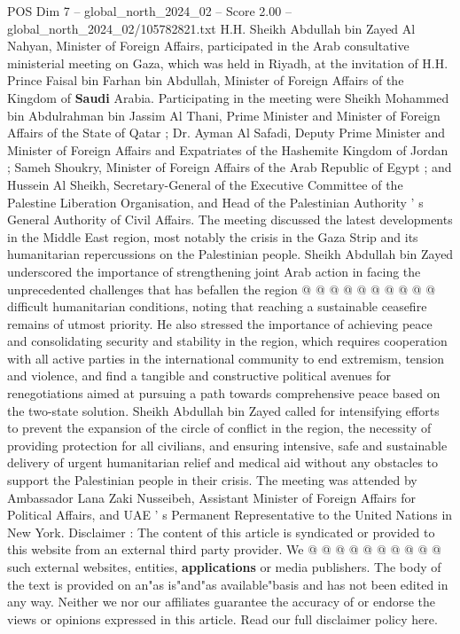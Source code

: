 \begin{textsample}{POS Dim 7 – global\_north\_2024\_02 – Score 2.00 – global\_north\_2024\_02/105782821.txt}  \label{ex:f7_pos_169}
H.H.
Sheikh Abdullah bin Zayed Al Nahyan, Minister of Foreign Affairs, participated in the Arab consultative ministerial meeting on Gaza, which was held in Riyadh, at the invitation of H.H.
Prince Faisal bin Farhan bin Abdullah, Minister of Foreign Affairs of the Kingdom of \textbf{Saudi} Arabia.
Participating in the meeting were Sheikh Mohammed bin Abdulrahman bin Jassim Al Thani, Prime Minister and Minister of Foreign Affairs of the State of Qatar ; Dr.
Ayman Al Safadi, Deputy Prime Minister and Minister of Foreign Affairs and Expatriates of the Hashemite Kingdom of Jordan ; Sameh Shoukry, Minister of Foreign Affairs of the Arab Republic of Egypt ; and Hussein Al Sheikh, Secretary-General of the Executive Committee of the Palestine Liberation Organisation, and Head of the Palestinian Authority ' s General Authority of Civil Affairs.
The meeting discussed the latest developments in the Middle East region, most notably the crisis in the Gaza Strip and its humanitarian repercussions on the Palestinian people.
Sheikh Abdullah bin Zayed underscored the importance of strengthening joint Arab action in facing the unprecedented challenges that has befallen the region @ @ @ @ @ @ @ @ @ @ difficult humanitarian conditions, noting that reaching a sustainable ceasefire remains of utmost priority.
He also stressed the importance of achieving peace and consolidating security and stability in the region, which requires cooperation with all active parties in the international community to end extremism, tension and violence, and find a tangible and constructive political avenues for renegotiations aimed at pursuing a path towards comprehensive peace based on the two-state solution.
Sheikh Abdullah bin Zayed called for intensifying efforts to prevent the expansion of the circle of conflict in the region, the necessity of providing protection for all civilians, and ensuring intensive, safe and sustainable delivery of urgent humanitarian relief and medical aid without any obstacles to support the Palestinian people in their crisis.
The meeting was attended by Ambassador Lana Zaki Nusseibeh, Assistant Minister of Foreign Affairs for Political Affairs, and UAE ' s Permanent Representative to the United Nations in New York.
Disclaimer : The content of this article is syndicated or provided to this website from an external third party provider.
We @ @ @ @ @ @ @ @ @ @ such external websites, entities, \textbf{applications} or media publishers.
The body of the text is provided on an"as is"and"as available"basis and has not been edited in any way.
Neither we nor our affiliates guarantee the accuracy of or endorse the views or opinions expressed in this article.
Read our full disclaimer policy here.

\end{textsample}

